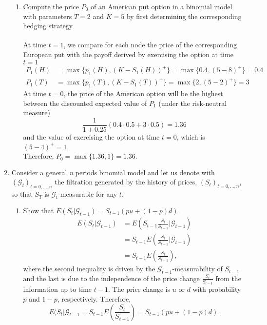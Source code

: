 \documentclass[11pt,a4,table]{article}
\begin{document}
\begin{enumerate}
\begin{enumerate}
        \item Compute the price $P_0$ of an American put option in a binomial model with parameters $T=2$ and $K=5$ by first determining the corresponding hedging strategy
        \\\\
        At time $t=1$, we compare for each node the price of the corresponding European put with the payoff derived by exercising the option at time $t=1$
        \begin{align*}
            P_1(H) &= \max\{p_1(H), (K-S_1(H))^+\} = \max\{0.4,(5-8)^+\}=0.4\\
            P_1(T) &= \max\{p_1(T), (K-S_1(T))^+\} = \max\{2,(5-2)^+\}=3
        \end{align*}
        At time $t=0$, the price of the American option will be the highest between the discounted expected value of $P_1$ (under the risk-neutral measure)
        \begin{equation*}
            \frac{1}{1+0.25}(0.4\cdot 0.5 + 3\cdot 0.5) = 1.36
        \end{equation*}
        and the value of exercising the option at time $t=0$, which is $(5-4)^+=1$. \\
        Therefore, $P_0 = \max\{1.36,1\}=1.36$.
    \end{enumerate}
    
    
    \item Consider a general \textit{n} periods binomial model and let us denote with $(\mathcal{G}_t)_{t=0,...,n}$ the filtration generated by the history of prices, $(S_t)_{t=0,...,n}$, so that $S_T$ is $\mathcal{G}_t$-measurable for any $t$.
    
    \begin{enumerate}
        \item Show that $E(S_t|\mathcal{G}_{t-1})=S_{t-1}(pu+(1-p)d)$.
        \begin{align*}
            E(S_t|\mathcal{G}_{t-1}) &= E\left(S_{t-1}\frac{S_t}{S_{t-1}} \bigg\vert\mathcal{G}_{t-1}\right)\\
            &=S_{t-1}E\left(\frac{S_t}{S_{t-1}} \bigg\vert\mathcal{G}_{t-1} \right)\\
            &=S_{t-1}E\left(\frac{S_t}{S_{t-1}}\right),
        \end{align*}
        where the second inequality is driven by the $\mathcal{G}_{t-1}$-measurability of $S_{t-1}$ and the last is due to the independence of the price change $\frac{S_t}{S_{t-1}}$ from the information up to time $t-1$. The price change is $u$ or $d$ with probability $p$ and $1-p$, respectively. Therefore,
        \begin{equation*}
            E(S_t|\mathcal{G}_{t-1} = S_{t-1}E\left(\frac{S_t}{S_{t-1}}\right) = S_{t-1}(pu+(1-p)d).
        \end{equation*}
        

\end{enumerate}
\end{enumerate}
\end{document}
